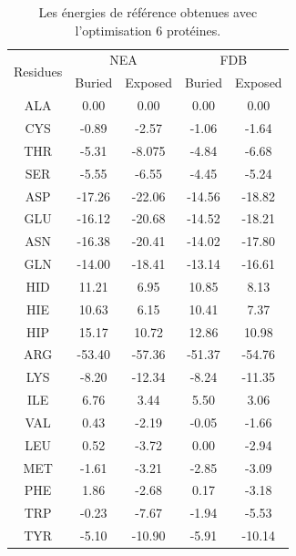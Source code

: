 \documentclass[a4paper,12pt]{article}
\begin{document}
    \begin{table}[!htbp]
      \centering

      \begin{tabular}{ccccc}

        \toprule
        \toprule
        \multirow{2}{*}{Residues}  & \multicolumn{2}{c}{NEA} & \multicolumn{2}{c}{FDB} \\
        \cmidrule(l{2pt}r{2pt}){2-3} \cmidrule(l{2pt}r{2pt}){4-5}
         & Buried & Exposed & Buried & Exposed \\
        \cmidrule{1-5}

        ALA &   0.00     &  0.00    &   0.00  &   0.00       \\
        CYS &  -0.89     &  -2.57   &  -1.06  &   -1.64      \\
        THR &  -5.31     &  -8.075  &  -4.84  &   -6.68      \\
        SER &  -5.55     &  -6.55   &  -4.45  &   -5.24      \\
        ASP &  -17.26    &  -22.06  &  -14.56 &   -18.82     \\
        GLU &  -16.12    &  -20.68  &  -14.52 &   -18.21     \\
        ASN &  -16.38    &  -20.41  &  -14.02 &   -17.80     \\
        GLN &  -14.00    &  -18.41  &  -13.14 &   -16.61     \\
        HID &   11.21    &  6.95    &  10.85  &   8.13       \\
        HIE &   10.63    &  6.15    &  10.41  &   7.37       \\
        HIP &   15.17    &  10.72   &  12.86  &   10.98      \\
        ARG &  -53.40    &  -57.36  &  -51.37 &   -54.76     \\
        LYS &  -8.20     &  -12.34  &  -8.24  &   -11.35     \\
        ILE &   6.76     &  3.44    &  5.50   &   3.06       \\
        VAL &   0.43     &  -2.19   &  -0.05  &   -1.66      \\
        LEU &   0.52     &  -3.72   &  0.00   &   -2.94      \\
        MET &  -1.61     &  -3.21   &  -2.85  &   -3.09      \\
        PHE &   1.86     &  -2.68   &  0.17   &   -3.18      \\
        TRP &  -0.23     &  -7.67   &  -1.94  &   -5.53      \\
        TYR &  -5.10     &  -10.90  &  -5.91  &   -10.14     \\

        \bottomrule


      \end{tabular}      
      \caption{Les énergies de référence obtenues avec l'optimisation 6 protéines.}
\label{tab:RefEner_groupes}      
    \end{table}
\end{document}
